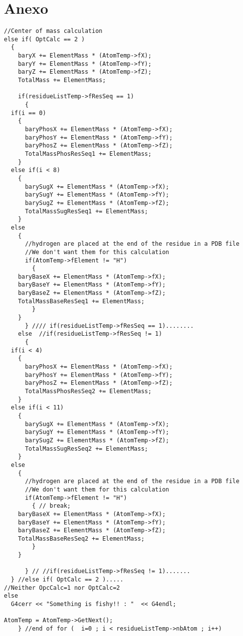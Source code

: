 \section{Anexo}
\label{app:B}
\lstset {language=C++}
\begin{lstlisting}
//Center of mass calculation
else if( OptCalc == 2 )
  {
    baryX += ElementMass * (AtomTemp->fX);
    baryY += ElementMass * (AtomTemp->fY);
    baryZ += ElementMass * (AtomTemp->fZ);
    TotalMass += ElementMass;

    if(residueListTemp->fResSeq == 1)
      {
  if(i == 0)
    {
      baryPhosX += ElementMass * (AtomTemp->fX);
      baryPhosY += ElementMass * (AtomTemp->fY);
      baryPhosZ += ElementMass * (AtomTemp->fZ);
      TotalMassPhosResSeq1 += ElementMass;
    }
  else if(i < 8)
    {
      barySugX += ElementMass * (AtomTemp->fX);
      barySugY += ElementMass * (AtomTemp->fY);
      barySugZ += ElementMass * (AtomTemp->fZ);
      TotalMassSugResSeq1 += ElementMass;
    }
  else
    {
      //hydrogen are placed at the end of the residue in a PDB file
      //We don't want them for this calculation
      if(AtomTemp->fElement != "H")
        {
    baryBaseX += ElementMass * (AtomTemp->fX);
    baryBaseY += ElementMass * (AtomTemp->fY);
    baryBaseZ += ElementMass * (AtomTemp->fZ);
    TotalMassBaseResSeq1 += ElementMass;
        }
    }
      } //// if(residueListTemp->fResSeq == 1)........
    else  //if(residueListTemp->fResSeq != 1)
      {
  if(i < 4)
    {
      baryPhosX += ElementMass * (AtomTemp->fX);
      baryPhosY += ElementMass * (AtomTemp->fY);
      baryPhosZ += ElementMass * (AtomTemp->fZ);
      TotalMassPhosResSeq2 += ElementMass;
    }
  else if(i < 11)
    {
      barySugX += ElementMass * (AtomTemp->fX);
      barySugY += ElementMass * (AtomTemp->fY);
      barySugZ += ElementMass * (AtomTemp->fZ);
      TotalMassSugResSeq2 += ElementMass;
    }
  else
    {
      //hydrogen are placed at the end of the residue in a PDB file
      //We don't want them for this calculation
      if(AtomTemp->fElement != "H")
        { // break;
    baryBaseX += ElementMass * (AtomTemp->fX);
    baryBaseY += ElementMass * (AtomTemp->fY);
    baryBaseZ += ElementMass * (AtomTemp->fZ);
    TotalMassBaseResSeq2 += ElementMass;
        }
    }

      } // //if(residueListTemp->fResSeq != 1).......
  } //else if( OptCalc == 2 ).....
//Neither OpcCalc=1 nor OptCalc=2
else
  G4cerr << "Something is fishy!! : "  << G4endl;

AtomTemp = AtomTemp->GetNext();
    } //end of for (  i=0 ; i < residueListTemp->nbAtom ; i++)
\end{lstlisting}
